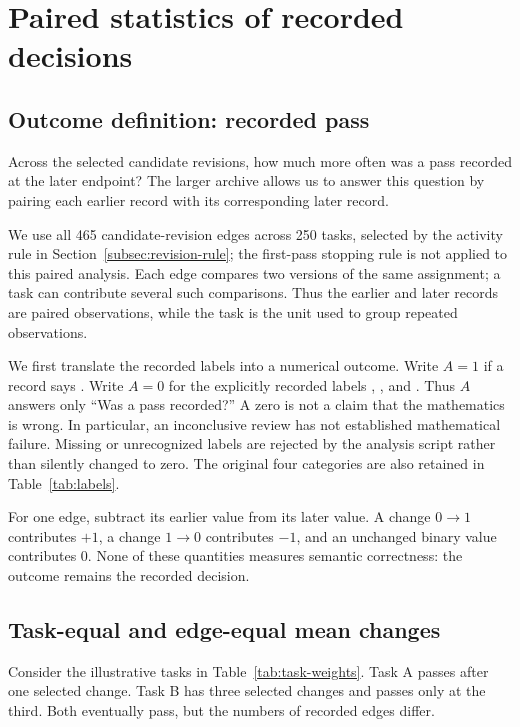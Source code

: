 \section{Paired statistics of recorded decisions}
\label{sec:statistics}

\subsection{Outcome definition: recorded pass}
\label{subsec:pass-coding}
Across the selected candidate revisions, how much more often was a pass recorded at the later endpoint? The larger archive allows us to answer this question by pairing each earlier record with its corresponding later record.

We use all 465 candidate-revision edges across 250 tasks, selected by the activity rule in Section~\ref{subsec:revision-rule}; the first-pass stopping rule is not applied to this paired analysis. Each edge compares two versions of the same assignment; a task can contribute several such comparisons. Thus the earlier and later records are paired observations, while the task is the unit used to group repeated observations.

We first translate the recorded labels into a numerical outcome. Write $A=1$ if a record says . Write $A=0$ for the explicitly recorded labels , , and . Thus $A$ answers only ``Was a pass recorded?'' A zero is not a claim that the mathematics is wrong. In particular, an inconclusive review has not established mathematical failure. Missing or unrecognized labels are rejected by the analysis script rather than silently changed to zero. The original four categories are also retained in Table~\ref{tab:labels}.

For one edge, subtract its earlier value from its later value. A change $0\to1$ contributes $+1$, a change $1\to0$ contributes $-1$, and an unchanged binary value contributes $0$. None of these quantities measures semantic correctness: the outcome remains the recorded decision.

\subsection{Task-equal and edge-equal mean changes}
\label{subsec:task-weighting}
Consider the illustrative tasks in Table~\ref{tab:task-weights}. Task A passes after one selected change. Task B has three selected changes and passes only at the third. Both eventually pass, but the numbers of recorded edges differ.

